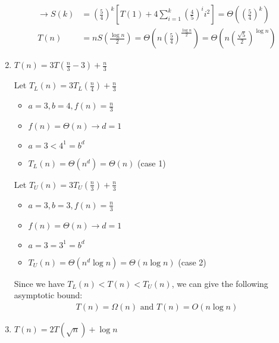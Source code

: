 \documentclass[11pt, a4paper, oneside]{memoir}
\begin{document}
\begin{enumerate}
\begin{align*}
              \rightarrow S(k)                                                         & = (\frac{5}{4})^k [T(1) + 4\sum_{i=1}^{k} (\frac{4}{5})^{i} i^2] = \Theta((\frac{5}{4})^k)                        \\
              T(n)                                                                     & = n S(\frac{\log n}{2}) = \Theta(n(\frac{5}{4})^{\frac{\log n}{2}}) = \Theta(n(\frac{\sqrt{5}}{2})^{\log n})
          \end{align*}

    \item \textbf{$T(n) = 3T(\frac{n}{3}-3) + \frac{n}{3}$}

          Let $T_L(n) = 3T_L(\frac{n}{4}) + \frac{n}{3}$\footnotemark
          \begin{itemize}
              \item $a = 3, b = 4, f(n) = \frac{n}{3}$
              \item $f(n) = \Theta(n) \rightarrow d = 1$
              \item $a = 3 < 4^1 = b^d$
              \item $T_L(n) = \Theta(n^d) = \Theta(n)$ (case 1)
          \end{itemize}

          Let $T_U(n) = 3T_U(\frac{n}{3}) + \frac{n}{3}$
          \begin{itemize}
              \item $a = 3, b = 3, f(n) = \frac{n}{3}$
              \item $f(n) = \Theta(n) \rightarrow d = 1$
              \item $a = 3 = 3^1 = b^d$
              \item $T_U(n) = \Theta(n^d \log n) = \Theta(n \log n)$ (case 2)
          \end{itemize}
          Since we have $T_L(n) < T(n) < T_U(n)$, we can give the following asymptotic bound:
          \begin{align*}
              T(n) = \Omega(n) \text{ and } T(n) = O(n \log n)
          \end{align*}

    \item \textbf{$T(n) = 2T(\sqrt{n}) + \log n$}


\end{enumerate}
\end{document}
